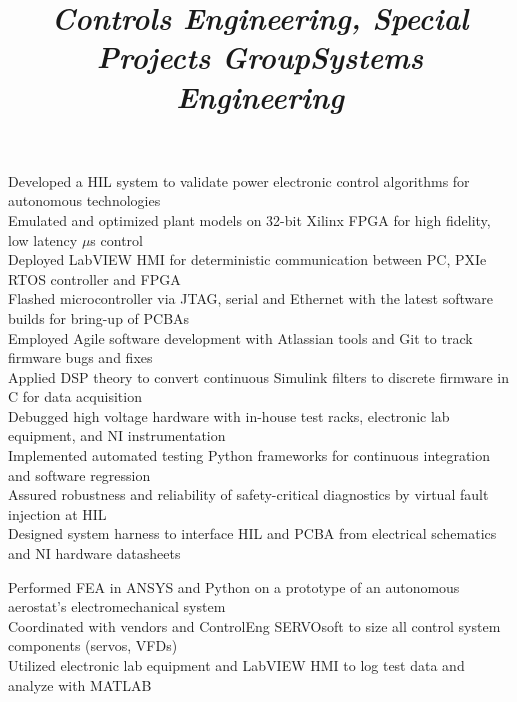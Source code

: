 \documentclass[mm]{res}
\newcommand{\tb}{\textbullet \xspace}
\begin{document}
\begin{resume}
\title{\textsl{Controls Engineering, Special Projects Group}}
\begin{position}
\tb Developed a HIL system to validate power electronic control algorithms for autonomous technologies\\
\tb Emulated and optimized plant models on 32-bit Xilinx FPGA for high fidelity, low latency $\mu$s control \\
\tb Deployed LabVIEW HMI for deterministic communication between PC, PXIe RTOS controller and FPGA \\
\tb Flashed microcontroller via JTAG, serial and Ethernet with the latest software builds for bring-up of PCBAs \\
\tb Employed Agile software development with Atlassian tools and Git to track firmware bugs and fixes \\
\tb Applied DSP theory to convert continuous Simulink filters to discrete firmware in C for data acquisition\\
\tb Debugged high voltage hardware with in-house test racks, electronic lab equipment, and NI instrumentation \\
\tb Implemented automated testing Python frameworks for continuous integration and software regression \\
\tb Assured robustness and reliability of safety-critical diagnostics by virtual fault injection at HIL\\
\tb Designed system harness to interface HIL and PCBA from electrical schematics and NI hardware datasheets
\end{position}

\title{\textsl{Systems Engineering}}
\begin{position}
\tb Performed FEA in ANSYS and Python on a prototype of an autonomous aerostat's electromechanical system \\
\tb Coordinated with vendors and ControlEng SERVOsoft to size all control system components (servos, VFDs) \\
\tb Utilized electronic lab equipment and LabVIEW HMI to log test data and analyze with MATLAB
\end{position}


\end{resume}
\end{document}
